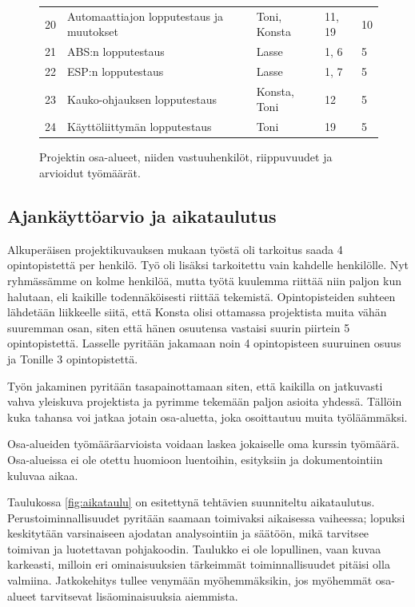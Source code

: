 \documentclass{article}
\begin{document}
\begin{figure}
\begin{tabular}{l l l l l}
		20 & Automaattiajon lopputestaus ja muutokset & Toni, Konsta & 11, 19 & 10 \\
		21 & ABS:n lopputestaus & Lasse & 1, 6 & 5 \\
		22 & ESP:n lopputestaus & Lasse & 1, 7 & 5\\
		23 & Kauko-ohjauksen lopputestaus & Konsta, Toni & 12 & 5 \\
		24 & Käyttöliittymän lopputestaus & Toni & 19 & 5 \\
	\end{tabular}
	\label{fig:osaalueet}
	\caption{Projektin osa-alueet, niiden vastuuhenkilöt, riippuvuudet ja arvioidut työmäärät.}
\end{figure}

\subsection{Ajankäyttöarvio ja aikataulutus}
\label{sec:ajankaytto}

Alkuperäisen projektikuvauksen mukaan työstä oli tarkoitus saada 4 opintopistettä per henkilö. Työ oli lisäksi tarkoitettu vain kahdelle henkilölle. Nyt ryhmässämme on kolme henkilöä, mutta työtä kuulemma riittää niin paljon kun halutaan, eli kaikille todennäköisesti riittää tekemistä. Opintopisteiden suhteen lähdetään liikkeelle siitä, että Konsta olisi ottamassa projektista muita vähän suuremman osan, siten että hänen osuutensa vastaisi suurin piirtein 5 opintopistettä. Lasselle pyritään jakamaan noin 4 opintopisteen suuruinen osuus ja Tonille 3 opintopistettä.

Työn jakaminen pyritään tasapainottamaan siten, että kaikilla on jatkuvasti vahva yleiskuva projektista ja pyrimme tekemään paljon asioita yhdessä. Tällöin kuka tahansa voi jatkaa jotain osa-aluetta, joka osoittautuu muita työläämmäksi.

Osa-alueiden työmääräarvioista voidaan laskea jokaiselle oma kurssin työmäärä. Osa-alueissa ei ole otettu huomioon luentoihin, esityksiin ja dokumentointiin kuluvaa aikaa.

Taulukossa \ref{fig:aikataulu} on esitettynä tehtävien suunniteltu aikataulutus. Perustoiminnallisuudet pyritään saamaan toimivaksi aikaisessa vaiheessa; lopuksi keskitytään varsinaiseen ajodatan analysointiin ja säätöön, mikä tarvitsee toimivan ja luotettavan pohjakoodin. Taulukko ei ole lopullinen, vaan kuvaa karkeasti, milloin eri ominaisuuksien tärkeimmät toiminnallisuudet pitäisi olla valmiina. Jatkokehitys tullee venymään myöhemmäksikin, jos myöhemmät osa-alueet tarvitsevat lisäominaisuuksia aiemmista.
\end{document}
